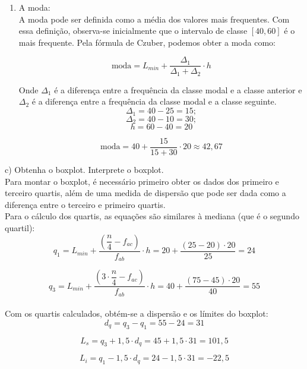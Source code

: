 \begin{enumerate}[i]
    \item A moda:
          \\

          A moda pode ser definida como a média dos valores mais frequentes. Com essa definição, observa-se inicialmente que o intervalo de classe $[40,60]$ é o mais frequente. Pela fórmula de Czuber, podemos obter a moda como:

          \[
              \text{moda} = L_{min} + \frac{\varDelta_1}{\varDelta_1 + \varDelta_2} \cdot h
          \]

          Onde $\varDelta_1$ é a diferença entre a frequência da classe modal e a classe anterior e $\varDelta_2$ é a diferença entre a frequência da classe modal e a classe seguinte.
          \\
          \[\varDelta_1 = 40 - 25 = 15; \]
          \[\varDelta_2 = 40 - 10 = 30; \]
          \[h= 60-40=20 \]

          \begin{equation}
              \text{moda} = 40 + \frac{15}{15+30} \cdot 20 \approx  42,67
          \end{equation}
\end{enumerate}

c) Obtenha o boxplot. Interprete o boxplot.
\\

Para montar o boxplot, é necessário primeiro obter os dados dos primeiro e terceiro quartis, além de uma medida de dispersão que pode ser dada como a diferença entre o terceiro e primeiro quartis.
\\

Para o cálculo dos quartis, as equações são similares à mediana (que é o segundo quartil):
\\

\[
    q_1 = L_{min} + \frac{\left(\dfrac{n}{4}-f_{ac}\right)}{f_{ab}}\cdot h = 20 + \frac{(25-20)\cdot 20}{25} = 24
\]

\[
    q_3 = L_{min} + \frac{\left(3\cdot\dfrac{n}{4}-f_{ac}\right)}{f_{ab}}\cdot h = 40 + \frac{(75-45)\cdot 20}{40} = 55
\]
\\

Com os quartis calculados, obtém-se a dispersão e os límites do boxplot:
\\

\[
    d_q = q_3 - q_1 = 55 - 24 = 31
\]

\[
    L_s = q_3 + 1,5\cdot d_q = 45 +1,5\cdot 31 = 101,5
\]

\[
    L_i = q_1 - 1,5\cdot d_q = 24 - 1,5\cdot 31 = -22,5
\]
\\

